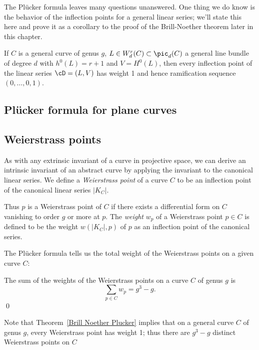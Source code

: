 The Pl\"ucker formula leaves many questions unanswered. One thing we do know is the behavior of the inflection points for a general linear series; we'll state this here and prove it as a corollary to the proof of the Brill-Noether theorem later in this chapter.

\begin{theorem}\label{Brill Noether Plucker}
If $C$ is a general curve of genus $g$, $L \in W^r_d(C) \subset \pic_d(C)$ a general line bundle of degree $d$ with $h^0(L) = r+1$ and $V = H^0(L)$, then every inflection point of the linear series $\cD = (L, V)$ has weight 1 and hence ramification sequence $(0, \dots, 0, 1)$.
\end{theorem}

\subsection{Pl\"ucker formula for plane curves}\label{plane curve pluecker}
\subsection{Weierstrass points}

As with any extrinsic invariant of a curve in projective space, we can derive an intrinsic invariant of an abstract curve by applying the invariant to the canonical linear series. We define a \emph{Weierstrass point} of a curve $C$ to be an inflection point of the canonical linear series $|K_C|$. 

Thus $p$ is a Weierstrass point of $C$ if there exists a  differential form on $C$ vanishing to order $g$ or more at $p$. The \emph{weight} $w_p$ of a Weierstrass point $p \in C$  is defined to be the weight $w(|K_C|,p)$ of $p$ as an inflection point of the canonical series. 

The Pl\"ucker formula tells us  the total weight of the Weierstrass points on a given curve $C$:

\begin{corollary}\label{plucker formula}
The sum of the weights of the Weierstrass points on a curve $C$ of genus $g$ is
$$
\sum_{p \in C} w_p = g^3-g.
$$\qed
\end{corollary}

Note that Theorem~\ref{Brill Noether Plucker} implies that on a general curve $C$ of genus $g$, every Weierstrass point has weight 1; thus there are $g^3-g$ distinct Weierstrass points on $C$


